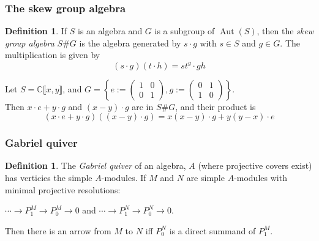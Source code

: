 \documentclass[screen, aspectratio=43]{beamer}
\theoremstyle{definition}
\newtheorem{defin}[theorem]{Definition}
\newcommand{\C}{\mathbb{C}}
\DeclareMathOperator{\Aut}{Aut}
\begin{document}
\begin{frame}
	\frametitle{The skew group algebra}
	\begin{defin}
		If $S$ is an algebra and $G$ is a subgroup of $\Aut(S)$, then the \textit{skew group algebra} $S\#G$ is the algebra generated by $s \cdot g$ with $s \in S$ and $g \in G$. The multiplication is given by $$(s \cdot g)(t \cdot h) = s t^g \cdot gh$$
	\end{defin}
	\begin{example}
		Let $S= \C \llbracket x, y \rrbracket$, and $G = \left\{ e:= \begin{pmatrix}
		1 & 0\\
		0 & 1
		\end{pmatrix}, g:= \begin{pmatrix}
		0 & 1\\
		1 & 0
		\end{pmatrix} \right\}$. \\
		Then $x \cdot e + y\cdot g$ and $(x-y) \cdot g$ are in $S\#G$, and their product is $$(x \cdot e + y\cdot g)((x-y) \cdot g) = x(x-y) \cdot g + y(y-x) \cdot e$$
	\end{example}
\end{frame}

\begin{frame}
	\frametitle{Gabriel quiver}
	\begin{defin}
		The \textit{Gabriel quiver} of an algebra, $A$ (where projective covers exist) has verticies the simple $A$-modules. If $M$ and $N$ are simple $A$-modules with minimal projective resolutions:
		\begin{center}
		$
		\cdots \to P^M_1 \to P^M_0 \to 0
		$
		\hspace{1cm}
		and
		\hspace{1cm}
		$
		\cdots \to P^N_1 \to P^N_0 \to 0
		$.
		\end{center}
		Then there is an arrow from $M$ to $N$ iff $P^N_0$ is a direct summand of $P^M_1$.
	\end{defin}
\end{frame}
\end{document}
